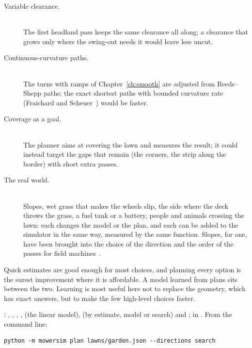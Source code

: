 \begin{description}
  \item[Variable clearance.]
    \leavevmode\\
    The first headland pass keeps the same clearance all along; a clearance
    that grows only where the swing-out needs it would leave less uncut.
  \item[Continuous-curvature paths.]
    \leavevmode\\
    The turns with ramps of Chapter~\ref{ch:smooth} are adjusted from
    Reeds--Shepp paths; the exact shortest paths with bounded curvature rate
    (Fraichard and Scheuer~\cite{fraichard2004reeds}) would be faster.
  \item[Coverage as a goal.]
    \leavevmode\\
    The planner aims at covering the lawn and measures the result; it could
    instead target the gaps that remain (the corners, the strip along the
    border) with short extra passes.
  \item[The real world.]
    \leavevmode\\
    Slopes, wet grass that makes the wheels slip, the side where the deck
    throws the grass, a fuel tank or a battery, people and animals crossing
    the lawn: each changes the model or the plan, and each can be added to
    the simulator in the same way, measured by the same function. Slopes,
    for one, have been brought into the choice of the direction and the
    order of the passes for field machines~\cite{jin2011coverage,
    hameed2014intelligent}.
\end{description}

\begin{inwords}
  Quick estimates are good enough for most choices, and planning every
  option is the surest improvement where it is affordable. A model learned
  from plans sits between the two. Learning is most useful here not to
  replace the geometry, which has exact answers, but to make the few
  high-level choices faster.
\end{inwords}

\begin{incode}
  : , ,
  , ,  (the linear model),
   (by estimate, model or search) and
  ;  in
  . From the command line:
  \begin{verbatim}
python -m mowersim plan lawns/garden.json --directions search
  \end{verbatim}
\end{incode}
